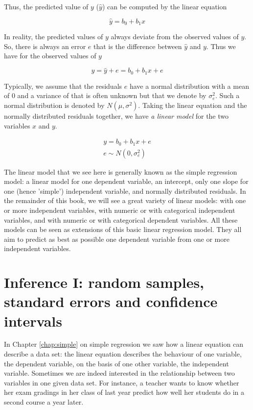 \documentclass[]{report}\usepackage[]{graphicx}\usepackage[]{color}
\begin{document}
Thus, the predicted value of $y$ ($\hat{y}$) can be computed by the linear equation

\begin{equation}
\hat{y}= b_0 + b_1 x
\end{equation}

In reality, the predicted values of $y$ always deviate from the observed values of $y$. So, there is always an error $e$ that is the difference between $\hat{y}$ and $y$. Thus we have for the observed values of $y$

\begin{equation}
y = \hat{y} + e = b_0 + b_1 x + e
\end{equation}

Typically, we assume that the residuals $e$ have a normal distribution with a mean of 0 and a variance of that is often unknown but that we denote by $\sigma^2_e$. Such a normal distribution is denoted by $N(\mu,\sigma^2)$. Taking the linear equation and the normally distributed residuals together, we have \textit{a linear model} for the two variables $x$ and $y$.


\begin{eqnarray}
y = b_0 + b_1 x + e \\
e \sim N(0,\sigma^2_e)
\end{eqnarray}


The linear model that we see here is generally known as the simple regression model: a linear model for one dependent variable, an intercept, only one slope for one (hence 'simple')  independent variable,  and normally distributed residuals. In the remainder of this book, we will see a great variety of linear models: with one or more independent variables, with numeric or with categorical independent variables, and with numeric or with categorical dependent variables. All these models can be seen as extensions of this basic linear regression model. They all aim to predict as best as possible one dependent variable from one or more independent variables. %





\chapter{Inference I: random samples, standard errors and confidence intervals}\label{chap:confidence}

In Chapter \ref{chap:simple} on simple regression we saw how a linear equation can describe a data set: the linear equation describes the behaviour of one variable, the dependent variable, on the basis of one other variable, the independent variable. Sometimes we are indeed interested in the relationship between two variables in one given data set. For instance, a teacher wants to know whether her exam gradings in her class of last year predict how well her students do in a second course a year later.
\end{document}
